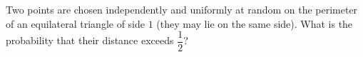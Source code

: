 Two points are chosen independently and uniformly at random on the perimeter of an equilateral triangle of side $1$ (they may lie on the same side). What is the probability that their distance exceeds $\dfrac12$?
